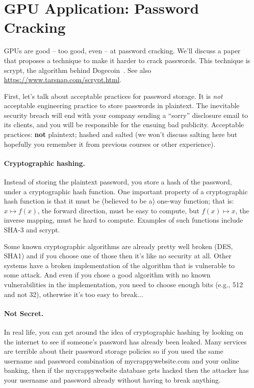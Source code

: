 




\section*{GPU Application: Password Cracking}

GPUs are good -- too good, even -- at password cracking. We'll discuss a paper
that proposes a technique to make it harder to crack passwords. This technique
is scrypt, the algorithm behind Dogecoin~\cite{scrypt}. See also \url{https://www.tarsnap.com/scrypt.html}.

First, let's talk about acceptable practices for password storage. It is \emph{not}
acceptable engineering practice to store passwords in plaintext. The inevitable security
breach will end with your company sending a ``sorry'' disclosure email to its clients,
and you will be responsible for the ensuing bad publicity. Acceptable practices: {\bf not} plaintext; hashed and salted (we won't discuss salting here but hopefully you remember it from previous courses or other experience).

\paragraph{Cryptographic hashing.} Instead of storing the plaintext password, you
store a hash of the password, under a cryptographic hash function. One important
property of a cryptographic hash function is that it must be (believed to be a) one-way
function; that is: $x \mapsto f(x)$, the forward direction, must be easy to compute, but
$f(x) \mapsto x$, the inverse mapping, must be hard to compute. Examples of such functions
include SHA-3 and scrypt. 

Some known cryptographic algorithms are already pretty well broken (DES, SHA1) and if you choose one of those then it's like no security at all. Other systems have a broken implementation of the algorithm that is vulnerable to some attack. And even if you chose a good algorithm with no known vulnerabilities in the implementation, you need to choose enough bits (e.g., 512 and not 32), otherwise it's too easy to break...

\paragraph{Not Secret.}
In real life, you can get around the idea of cryptographic hashing by looking on the internet to see if someone's password has already been leaked. Many services are terrible about their password storage policies so if you used the same username and password combination of mycrappywebsite.com and your online banking, then if the mycrappywebsite database gets hacked then the attacker has your username and password already without having to break anything.

